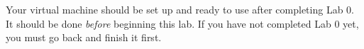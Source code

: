 \documentclass{article}
\begin{document}

Your virtual machine should be set up and ready to use after completing Lab 0. It should be done \textit{before} beginning this lab. If you have not completed Lab 0 yet, you must go back and finish it first.
\end{document}
